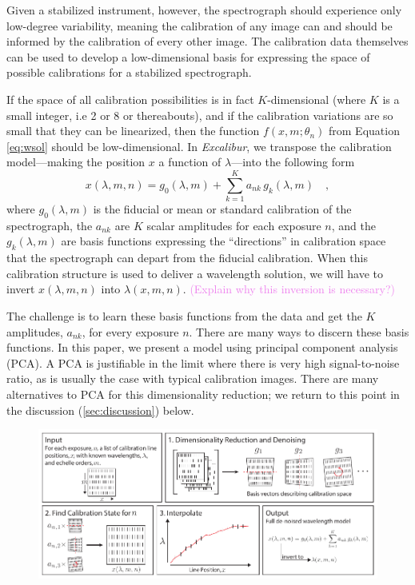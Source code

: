 \documentclass[modern]{aastex63}
\newcommand{\project}[1]{\textsl{#1}}
\newcommand{\name}{\project{Excalibur}}
\newcommand{\mb}[1]{\textcolor{violet}{#1}}
\begin{document}
Given a stabilized instrument, however, the spectrograph should experience only low-degree variability, meaning the calibration of any image can and should be informed by the calibration of every other image.  The calibration data themselves can be used to develop a low-dimensional basis for expressing the space of possible calibrations for a stabilized spectrograph.

If the space of all calibration possibilities is in fact $K$-dimensional (where $K$ is a small integer, i.e 2 or 8 or thereabouts), and if the calibration variations are so small that they can be linearized, then the function $f(x,m;\theta_{n})$ from Equation \ref{eq:wsol} should be low-dimensional.  In \name, we transpose the calibration model---making the position $x$ a function of $\lambda$---into the following form
\begin{equation}
x(\lambda,m,n) = g_0(\lambda,m) + \sum_{k=1}^K a_{nk}\,g_k(\lambda,m)
\quad ,
\label{eq:excl_wsol}
\end{equation}
where
$g_0(\lambda,m)$ is the fiducial or mean or standard calibration of the spectrograph,
the $a_{nk}$ are $K$ scalar amplitudes for each exposure $n$,
and the $g_k(\lambda,m)$ are basis functions expressing the ``directions'' in calibration space that the spectrograph can depart from the fiducial calibration.  When this calibration structure is used to deliver a wavelength solution, we will have to invert $x(\lambda,m,n)$ into $\lambda(x,m,n)$.  \mb{(Explain why this inversion is necessary?)}

The challenge is to learn these basis functions from the data and get the $K$ amplitudes, $a_{nk}$, for every exposure $n$.  There are many ways to discern these basis functions.  In this paper, we present a model using principal component analysis (PCA).  A PCA is justifiable in the limit where there is very high signal-to-noise ratio, as is usually the case with typical calibration images.  There are many alternatives to PCA for this dimensionality reduction; we return to this point in the discussion (\textsection \ref{sec:discussion}) below.

\begin{figure}[h]
\centering
\includegraphics[width=\textwidth]{Figures/methodCartoon.pdf}
\caption{}
\label{fig:testHists}
\end{figure} 
\end{document}
